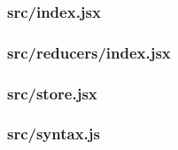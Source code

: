 \subsubsection{src/index.jsx}
\label{app:client_src_index_jsx}

\subsubsection{src/reducers/index.jsx}
\label{app:client_src_reducers_index_jsx}

\subsubsection{src/store.jsx}
\label{app:client_src_store_jsx}

\subsubsection{src/syntax.js}
\label{app:client_src_syntax_js}

